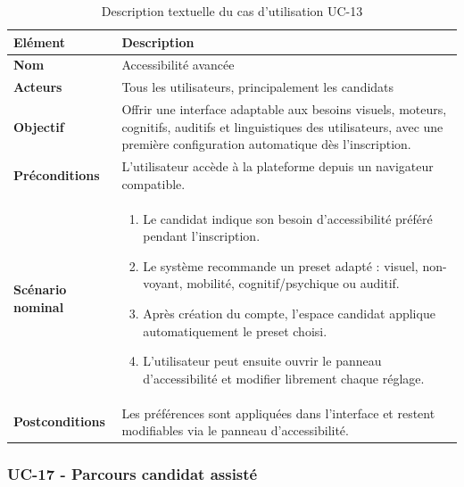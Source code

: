 \documentclass[12pt,a4paper]{report}
\newcommand{\tblhead}[1]{\cellcolor{darkblue}\color{white}\bfseries #1}
\newcommand{\tblleft}[1]{\bfseries\color{darkblue} #1}
\begin{document}
\renewcommand{\arraystretch}{1.25}
\begin{table}[H]
\centering
\begin{tabularx}{\textwidth}{|L{3.2cm}|Y|}
\hline
\tblhead{Elément} & \tblhead{Description} \\
\hline
\tblleft{Nom} & Accessibilité avancée \\
\hline
\tblleft{Acteurs} & Tous les utilisateurs, principalement les candidats \\
\hline
\tblleft{Objectif} & Offrir une interface adaptable aux besoins visuels, moteurs, cognitifs, auditifs et linguistiques des utilisateurs, avec une première configuration automatique dès l'inscription. \\
\hline
\tblleft{Préconditions} & L'utilisateur accède à la plateforme depuis un navigateur compatible. \\
\hline
\tblleft{Scénario nominal} &
\begin{enumerate}
  \item Le candidat indique son besoin d'accessibilité préféré pendant l'inscription.
  \item Le système recommande un preset adapté : visuel, non-voyant, mobilité, cognitif/psychique ou auditif.
  \item Après création du compte, l'espace candidat applique automatiquement le preset choisi.
  \item L'utilisateur peut ensuite ouvrir le panneau d'accessibilité et modifier librement chaque réglage.
\end{enumerate} \\
\hline
\tblleft{Postconditions} & Les préférences sont appliquées dans l'interface et restent modifiables via le panneau d'accessibilité. \\
\hline
\end{tabularx}
\caption{Description textuelle du cas d'utilisation UC-13}
\label{tab:uc13-accessibilite}
\end{table}
\renewcommand{\arraystretch}{1}

\subsubsection{UC-17 - Parcours candidat assisté}
\end{document}
